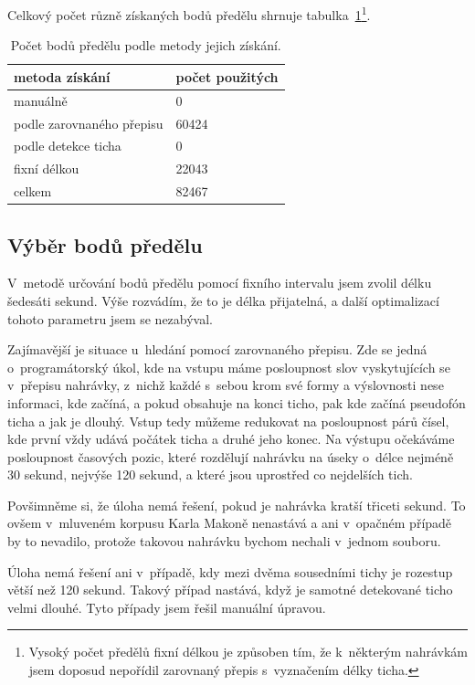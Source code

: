 Celkový počet různě získaných bodů předělu shrnuje
tabulka~\ref{tab:splitpoints}\footnote{Vysoký počet předělů fixní délkou je způsoben tím, že
k~některým nahrávkám jsem doposud nepořídil zarovnaný přepis s~vyznačením délky
ticha.}.

\begin{table}[htpb]
\begin{center}
\begin{tabular}{|l|l|}
\hline
metoda získání & počet použitých \\
\hline
manuálně & 0 \\
podle zarovnaného přepisu & 60424 \\
podle detekce ticha & 0 \\
fixní délkou & 22043 \\
celkem & 82467 \\
\hline
\end{tabular}
\caption{Počet bodů předělu podle metody jejich získání.}\label{tab:splitpoints}
\end{center}
\end{table}

\subsection{Výběr bodů předělu}

V~metodě určování bodů předělu pomocí fixního intervalu jsem zvolil délku
šedesáti sekund. Výše rozvádím, že to je délka přijatelná, a další
optimalizací tohoto parametru jsem se nezabýval.

Zajímavější je situace u~hledání pomocí zarovnaného přepisu. Zde se jedná
o~programátorský úkol, kde na vstupu máme posloupnost slov vyskytujících se
v~přepisu nahrávky, z~nichž každé s~sebou krom své formy a výslovnosti nese
informaci, kde začíná, a pokud obsahuje na konci ticho, pak kde začíná
pseudofón ticha a jak je dlouhý. Vstup tedy můžeme redukovat na posloupnost
párů čísel, kde první vždy udává počátek ticha a druhé jeho konec. Na výstupu
očekáváme posloupnost časových pozic, které rozdělují nahrávku na úseky o~délce
nejméně 30 sekund, nejvýše 120 sekund, a které jsou uprostřed co nejdelších
tich.

Povšimněme si, že úloha nemá řešení, pokud je nahrávka kratší třiceti sekund. To
ovšem v~mluveném korpusu Karla Makoně nenastává a ani v~opačném případě by to nevadilo,
protože takovou nahrávku bychom nechali v~jednom souboru.

Úloha nemá řešení ani v~případě, kdy mezi dvěma sousedními tichy
je rozestup větší než 120 sekund. Takový případ nastává, když je samotné
detekované ticho velmi dlouhé. Tyto případy jsem řešil manuální úpravou.

